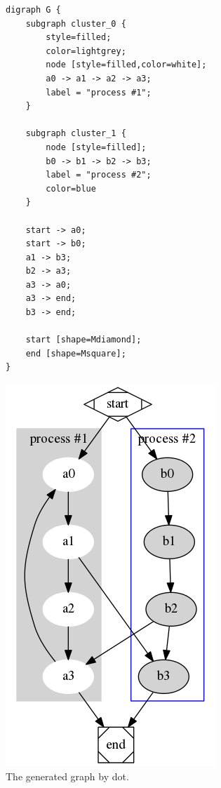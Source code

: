 \documentclass[a4paper]{report}
\begin{document}
\begin{figure}
\begin{minipage}{0.45\textwidth}
\begin{lstlisting}[caption=The code to create a graph., label=lst:Dot_Example]
digraph G {
	subgraph cluster_0 {
		style=filled;
		color=lightgrey;
		node [style=filled,color=white];
		a0 -> a1 -> a2 -> a3;
		label = "process #1";
	}

	subgraph cluster_1 {
		node [style=filled];
		b0 -> b1 -> b2 -> b3;
		label = "process #2";
		color=blue
	}
	
	start -> a0;
	start -> b0;
	a1 -> b3;
	b2 -> a3;
	a3 -> a0;
	a3 -> end;
	b3 -> end;

	start [shape=Mdiamond];
	end [shape=Msquare];
}
\end{lstlisting}
\end{minipage}\hfill
\begin{minipage}{0.45\textwidth}
\centering
\includegraphics[width=\linewidth]{images/AOFDot/SmallExample.png}
\caption{The generated graph by dot.}
\label{fig:Dot_Example}
\end{minipage}
\end{figure}
\end{document}

